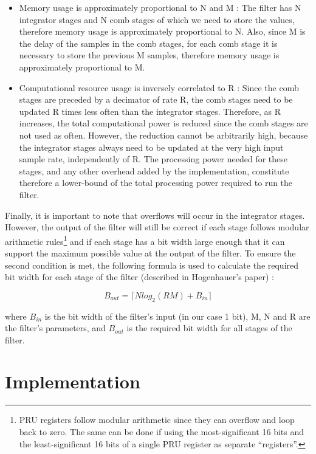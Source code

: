 \documentclass[]{report}
\providecommand{\tightlist}{%
	\setlength{\itemsep}{0pt}\setlength{\parskip}{0pt}}
\begin{document}
\begin{itemize}
\tightlist
\item
  Memory usage is approximately proportional to N and M : The filter has N integrator stages and N comb stages of which we need to store the values, therefore memory usage is approximately proportional to N. Also, since M is the delay of the samples in the comb stages, for each comb stage it is necessary to store the previous M samples, therefore memory usage is approximately proportional to M.
\item
  Computational resource usage is inversely correlated to R : Since the comb stages are preceded by a decimator of rate R, the comb stages need to be updated R times less often than the integrator stages. Therefore, as R increases, the total computational power is reduced since the comb stages are not used as often. However, the reduction cannot be arbitrarily high, because the integrator stages always need to be updated at the very high input sample rate, independently of R. The processing power needed for these stages, and any other overhead added by the implementation, constitute therefore a lower-bound of the total processing power required to run the filter.
\end{itemize}

Finally, it is important to note that overflows will occur in the integrator stages. However, the output of the filter will still be correct if each stage follows modular arithmetic rules\footnote{PRU registers follow modular arithmetic since they can overflow and loop back to zero. The same can be done if using the most-significant 16 bits and the least-significant 16 bits of a single PRU register as separate ``registers''.} and if each stage has a bit width large enough that it can support the maximum possible value at the output of the filter. To ensure the second condition is met, the following formula is used to calculate the required bit width for each stage of the filter (described in Hogenhauer's paper) :

\begin{equation}
\label{eq:bout}
B_{out} = \lceil Nlog_2(RM) + B_{in} \rceil
\end{equation}

\noindent where \(B_{in}\) is the bit width of the filter's input (in our case 1
bit), M, N and R are the filter's parameters, and \(B_{out}\) is the
required bit width for all stages of the filter.

\hypertarget{implementation}{%
\chapter{Implementation}\label{implementation}}
\end{document}
